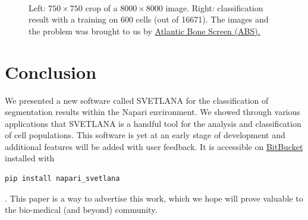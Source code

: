 \documentclass{article}
\begin{document}
\begin{figure}[h!]
\begin{center}
     \ 
     \ 
  \end{center}
  \caption{Left: $750\times 750$ crop of a $8000\times 8000$ image. Right: classification result with a training on 600 cells (out of 16671).
The images and the problem was brought to us by \href{https://www.atlantic-bone-screen.com/language/en/osteoclasts-2/}{Atlantic Bone Screen (ABS).}}
\end{figure}

\section{Conclusion}
\label{sec:conclusion}

We presented a new software called SVETLANA for the classification of segmentation results within the Napari environment. 
We showed through various applications that SVETLANA is a handful tool for the analysis and classification of cell populations. 
This software is yet at an early stage of development and additional features will be added with user feedback.
It is accessible on \href{https://bitbucket.org/koopa31/napari_svetlana/src/main/}{BitBucket} installed with \begin{verbatim}pip install napari_svetlana\end{verbatim}. 
This paper is a way to advertise this work, which we hope will prove valuable to the bio-medical (and beyond) community. 

\end{document}
